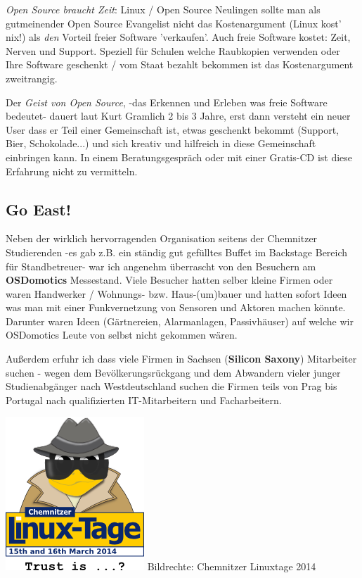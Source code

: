 \textit{Open Source braucht Zeit}: Linux / Open Source Neulingen sollte man als gutmeinender Open Source Evangelist nicht das Kostenargument (Linux kost' nix!) als \emph{den} Vorteil freier Software 'verkaufen'. Auch freie Software kostet: Zeit, Nerven und Support. Speziell für Schulen welche Raubkopien verwenden oder Ihre Software geschenkt / vom Staat bezahlt bekommen ist das Kostenargument zweitrangig. 

Der \emph{Geist von Open Source}, -das Erkennen und Erleben was freie Software bedeutet- dauert laut Kurt Gramlich 2 bis 3 Jahre, erst dann versteht ein neuer User dass er Teil einer Gemeinschaft ist, etwas geschenkt bekommt (Support, Bier, Schokolade...) und sich kreativ und hilfreich in diese Gemeinschaft einbringen kann. In einem Beratungsgespräch oder mit einer Gratis-CD ist diese Erfahrung nicht zu vermitteln.


\subsection*{Go East!}
Neben der wirklich hervorragenden Organisation seitens der Chemnitzer Studierenden -es gab z.B. ein ständig gut gefülltes Buffet im Backstage Bereich für Standbetreuer- war ich angenehm überrascht von den Besuchern am \textbf{OSDomotics} Messestand. Viele Besucher hatten selber kleine Firmen oder waren Handwerker / Wohnungs- bzw. Haus-(um)bauer und hatten sofort Ideen was man mit einer Funkvernetzung von Sensoren und Aktoren machen könnte. Darunter waren Ideen (Gärtnereien, Alarmanlagen, Passivhäuser) auf welche wir OSDomotics Leute von selbst nicht gekommen wären. 

Außerdem erfuhr ich dass viele Firmen in Sachsen (\textbf{Silicon Saxony}) Mitarbeiter suchen - wegen dem Bevölkerungsrückgang und dem Abwandern vieler junger Studienabgänger nach Westdeutschland suchen die Firmen teils von Prag bis Portugal nach qualifizierten IT-Mitarbeitern und Facharbeitern.

\begin{center}
\includegraphics[width=0.5\linewidth]{chemnitz/chemnitz_logo14.png}
\footnotesize{Bildrechte: Chemnitzer Linuxtage 2014}
\end{center}

